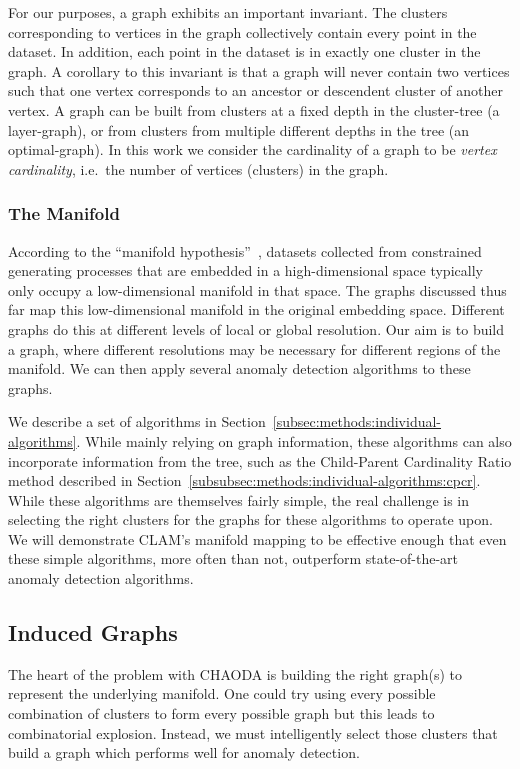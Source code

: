 For our purposes, a graph exhibits an important invariant.
The clusters corresponding to vertices in the graph collectively contain every point in the dataset.
In addition, each point in the dataset is in exactly one cluster in the graph.
A corollary to this invariant is that a graph will never contain two vertices such that one vertex corresponds to an ancestor or descendent cluster of another vertex.
A graph can be built from clusters at a fixed depth in the cluster-tree (a layer-graph), or from clusters from multiple different depths in the tree (an optimal-graph).
In this work we consider the cardinality of a graph to be \textit{vertex cardinality}, i.e.\ the number of vertices (clusters) in the graph.

\subsubsection{The Manifold}
According to the ``manifold hypothesis''~\cite{fefferman2016testing}, datasets collected from constrained generating processes that are embedded in a high-dimensional space typically only occupy a low-dimensional manifold in that space.
The graphs discussed thus far map this low-dimensional manifold in the original embedding space.
Different graphs do this at different levels of local or global resolution.
Our aim is to build a graph, where different resolutions may be necessary for different regions of the manifold.
We can then apply several anomaly detection algorithms to these graphs.

We describe a set of algorithms in Section~\ref{subsec:methods:individual-algorithms}.
While mainly relying on graph information, these algorithms can also incorporate information from the tree, such as the Child-Parent Cardinality Ratio method described in Section~\ref{subsubsec:methods:individual-algorithms:cpcr}.
While these algorithms are themselves fairly simple, the real challenge is in selecting the right clusters for the graphs for these algorithms to operate upon.
We will demonstrate CLAM's manifold mapping to be effective enough that even these simple algorithms, more often than not, outperform state-of-the-art anomaly detection algorithms.


\subsection{Induced Graphs}
\label{subsec:methods:induced-graphs}

The heart of the problem with CHAODA is building the right graph(s) to represent the underlying manifold.
One could try using every possible combination of clusters to form every possible graph but this leads to combinatorial explosion.
Instead, we must intelligently select those clusters that build a graph which performs well for anomaly detection.

